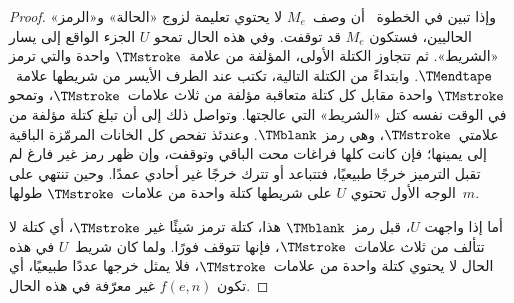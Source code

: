 \documentclass[../../../include/open-logic-section]{subfiles}
\begin{document}
\begin{proof}
  وإذا تبين في الخطوة~ أن وصف~$M_e$ لا يحتوي تعليمة
  لزوج «الحالة» و«الرمز» الحاليين، فستكون $M_e$ قد توقفت. وفي هذه
  الحال تمحو $U$ الجزء الواقع إلى يسار «الشريط». ثم تتجاوز الكتلة
  الأولى، المؤلفة من علامة~$\TMstroke$ واحدة والتي ترمز
  $\TMendtape$. وابتداءً من الكتلة التالية، تكتب عند الطرف الأيسر من
  شريطها علامة~$\TMstroke$ واحدة مقابل كل كتلة متعاقبة مؤلفة من ثلاث
  علامات~$\TMstroke$، وتمحو في الوقت نفسه كتل «الشريط» التي عالجتها.
  وتواصل ذلك إلى أن تبلغ كتلة مؤلفة من علامتي~$\TMstroke$، وهي رمز
  $\TMblank$. وعندئذ تفحص كل الخانات المرمّزة الباقية إلى يمينها؛ فإن
  كانت كلها فراغات محت الباقي وتوقفت، وإن ظهر رمز غير فارغ لم تقبل
  الترميز خرجًا طبيعيًا، فتتباعد أو تترك خرجًا غير أحادي عمدًا. وحين
  تنتهي على الوجه الأول تحتوي $U$ على شريطها كتلة واحدة من
  علامات~$\TMstroke$ طولها~$m$.


  أما إذا واجهت $U$، قبل رمز~$\TMblank$ هذا، كتلة ترمز شيئًا غير
  $\TMstroke$، أي كتلة لا تتألف من ثلاث علامات~$\TMstroke$، فإنها
  تتوقف فورًا. ولما كان شريط~$U$ في هذه الحال لا يحتوي كتلة واحدة من
  علامات~$\TMstroke$، فلا يمثل خرجها عددًا طبيعيًا، أي تكون $f(e,n)$
  غير معرّفة في هذه الحال.
\end{proof}
\end{document}
